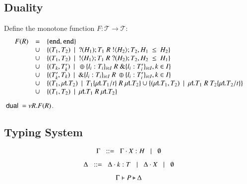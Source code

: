 \subsection{Duality}

\begin{definition}
Define the monotone function $F: \mathcal{T} \longrightarrow \mathcal{T}$:
%
\[
	\begin{array}{rcl}
		F(R)	& = &	\{\mathtt{end}, \mathtt{end}\}\\
			&\cup&	\{(T_1, T_2) \ \ |\ \  ? (H_1) ; T_1\ R\ ! \langle H_2 \rangle ; T_2, H_1\ \leq\ H_2\}\\
			&\cup&	\{(T_1, T_2) \ \ |\ \  ! \langle H_1 \rangle ; T_1\ R\ ? (H_2) ; T_2, H_2\ \leq\ H_1\}\\
			&\cup&	\{(T_k, T'_k) \ \ |\ \  \oplus \{l_i: T_i\}_{i \in I}\ R\ \& \{l_i: T'_i\}_{i \in I}, k \in I\}\\
			&\cup&	\{(T'_k, T_k) \ \ |\ \  \& \{l_i: T_i\}_{i \in I}\ R\ \oplus \{l_i: T'_i\}_{i \in I}, k \in I\}\\
			&\cup&	\{(T_1, \mu\mathsf{t}.T_2) \ \ |\ \  T_1\{\mu\mathsf{t}.T_1/t \}\ R\ \mu\mathsf{t}.T_2\}
			\cup	\{(\mu\mathsf{t}.T_1, T_2) \ \ |\ \  \mu\mathsf{t}.T_1\ R\ T_2\{\mu\mathsf{t}.T_2/t \}\}\\
			&\cup&	\{(T_1, T_2) \ \ |\ \  \mu\mathsf{t}.T_1\ R\ \mu\mathsf{t}.T_2\}
	\end{array}
\]
%
$\ \mathsf{dual}\  = \nu R.F(R)$.
\end{definition}

\subsection{Typing System}

\[
	\Gamma \;\;::=\;\; \Gamma \cdot X: H \;\;\;|\;\;\; \emptyset
\]

\[
	\Delta \;\;::=\;\; \Delta \cdot k:T \;\;\;|\;\;\; \Delta \cdot X \;\;\;|\;\;\; \emptyset
\]

\[
	\Gamma \vdash P \triangleright \Delta
\]

